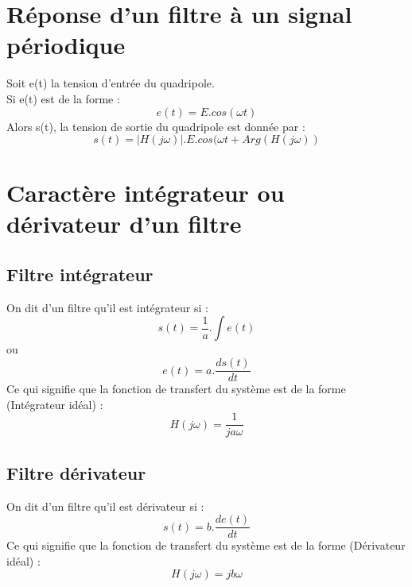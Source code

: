 \section{Réponse d'un filtre à un signal périodique}
Soit e(t) la tension d'entrée du quadripole.\\
Si e(t) est de la forme : 
$$e(t) = E.cos(\omega t)$$
Alors s(t), la tension de sortie du quadripole est donnée par :
$$s(t) = |H(j\omega)|.E.cos(\omega t + Arg(H(j\omega))$$
\section{Caractère intégrateur ou dérivateur d'un filtre}
\subsection{Filtre intégrateur}
\begin{de}
On dit d'un filtre qu'il est intégrateur si :
$$s(t) = \dfrac{1}{a}.\int e(t)$$
ou
$$e(t) = a.\dfrac{ds(t)}{dt}$$
Ce qui signifie que la fonction de transfert du système est de la forme (Intégrateur idéal) : 
$$H(j\omega) = \dfrac{1}{ja\omega}$$
\end{de}
\subsection{Filtre dérivateur}
\begin{de}
On dit d'un filtre qu'il est dérivateur si :
$$s(t) = b.\dfrac{de(t)}{dt}$$
Ce qui signifie que la fonction de transfert du système est de la forme (Dérivateur idéal) : 
$$H(j\omega) = jb\omega$$
\end{de}

